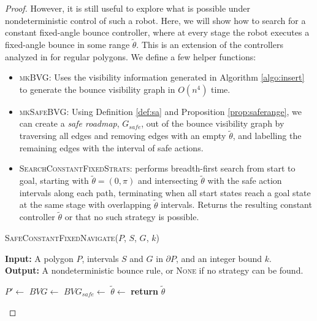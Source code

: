 \documentclass[]{styles/svproc}  %
\begin{document}
\begin{proof}
\vspace{1em}

However, it is still useful to explore what is possible under nondeterministic
control of such a robot. Here, we will show how to
search for a constant fixed-angle bounce controller, where at every stage the
robot executes a fixed-angle bounce in some range $\tilde{\theta}$. This is an
extension of the controllers analyzed in \cite{NilBecLav17} for regular polygons.
We define a few helper functions:

\begin{itemize}
\item \textsc{mkBVG}: Uses the visibility information generated in Algorithm
\ref{algo:insert} to generate the bounce visibility graph in $O(n^4)$ time.
\item \textsc{mkSafeBVG}: Using Definition \ref{def:sa} and Proposition \ref{prop:saferange}, we can create a \emph{safe roadmap}, $G_{safe}$,
        out of the bounce visibility graph by traversing all edges and removing edges with an 
        empty $\tilde{\theta}$, and labelling the remaining edges with the interval 
        of safe actions.
\item \textsc{SearchConstantFixedStrats}: performs breadth-first search from
start to goal, starting with $\tilde{\theta} = (0, \pi)$ and intersecting
$\tilde{\theta}$ with the safe action intervals along each path, terminating
when all start states reach a goal state at the same stage with overlapping
$\tilde{\theta}$ intervals. Returns the resulting constant controller $\tilde{\theta}$ or that
no such strategy is possible.
\end{itemize}

\begin{algorithm}
\caption{\textsc{SafeConstantFixedNavigate}($P$, $S$, $G$, $k$)}
\label{algo:nav}
\hspace*{\algorithmicindent} \textbf{Input:} A polygon $P$, intervals $S$ and
$G$ in $\partial P$, and an integer bound $k$.\\
\hspace*{\algorithmicindent} \textbf{Output:} A nondeterministic bounce rule,
or \textsc{None} if no strategy can be found.
\begin{algorithmic}[1]
\State $P' \gets$ 
\State $BVG \gets$ 
\State $BVG_{safe} \gets$ 
\State $\tilde{\theta} \gets$ 
\State \textbf{return} $\tilde{\theta}$
\end{algorithmic}
\end{algorithm}


\end{proof}
\end{document}
